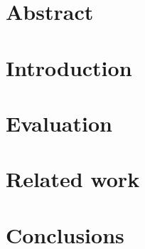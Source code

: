\documentclass[12pt,a4paper]{report}
\begin{document}


\maketitle
\tableofcontents

\chapter{Abstract}


\chapter{Introduction}






\chapter{Evaluation}


\chapter{Related work}


\chapter{Conclusions}


\printglossaries



\end{document}
